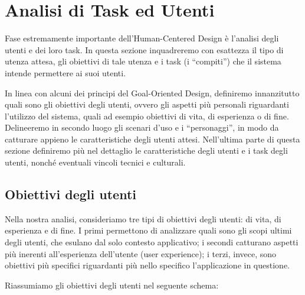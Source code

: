 \documentclass[12pt,a4paper,openright, notitlepage]{report}
\begin{document}

\chapter{Analisi di Task ed Utenti}

Fase estremamente importante dell’Human-Centered Design è l’analisi degli utenti e dei loro task. In questa sezione inquadreremo con esattezza il tipo di utenza attesa, gli obiettivi di tale utenza e i task (i “compiti”) che il sistema intende permettere ai suoi utenti.

In linea con alcuni dei principi del Goal-Oriented Design, definiremo innanzitutto quali sono gli obiettivi degli utenti, ovvero gli aspetti più personali riguardanti l’utilizzo del sistema, quali ad esempio obiettivi di vita, di esperienza o di fine. Delineeremo in secondo luogo gli scenari d’uso e i “personaggi”, in modo da catturare appieno le caratteristiche degli utenti attesi. Nell’ultima parte di questa sezione definiremo più nel dettaglio le caratteristiche degli utenti e i task degli utenti, nonché eventuali vincoli tecnici e culturali.

\section{Obiettivi degli utenti}

Nella nostra analisi, consideriamo tre tipi di obiettivi degli utenti: di vita, di esperienza e di fine. I primi permettono di analizzare quali sono gli scopi ultimi degli utenti, che esulano dal solo contesto applicativo; i secondi catturano aspetti più inerenti all’esperienza dell’utente (user experience); i terzi, invece, sono obiettivi più specifici riguardanti più nello specifico l’applicazione in questione.

Riassumiamo gli obiettivi degli utenti nel seguente schema:
\end{document}
